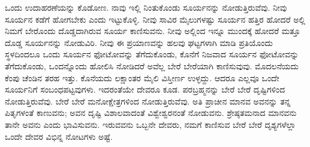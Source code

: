 ಒಂದು ಉದಾಹರಣೆಯನ್ನು ಕೊಡೋಣ. ನಾವು ಇಲ್ಲಿ ನಿಂತುಕೊಂಡು ಸೂರ್ಯನನ್ನು ನೋಡುತ್ತಿರುವೆವು. ನೀವು ಸೂರ್ಯನ ಕಡೆಗೆ ಹೋಗಬೇಕು ಎಂದು ಇಟ್ಟುಕೊಳ್ಳಿ. ನೀವು ಸಾವಿರ ಮೈಲುಗಳಷ್ಟು ಸೂರ್ಯನ ಹತ್ತಿರ ಹೋದರೆ ಅಲ್ಲಿ ನಿಮಗೆ ಬೇರೊಂದು ದೊಡ್ಡದಾಗಿರುವ ಸೂರ್ಯ ಕಾಣಿಸುವನು. ನೀವು ಅಲ್ಲಿಂದ ಇನ್ನೂ ಮುಂದಕ್ಕೆ ಹೋದರೆ ಮತ್ತೂ ದೊಡ್ಡ ಸೂರ್ಯನನ್ನು ನೋಡುವಿರಿ. ನೀವು ಈ ಪ್ರಯಾಣವನ್ನು ಹಲವು ಘಟ್ಟಗಳಾಗಿ ಮಾಡಿ ಪ್ರತಿಯೊಂದು ಸ್ಥಳದಿಂದಲೂ ಒಂದು ಸೂರ್ಯನ ಫೋಟೋವನ್ನು ತೆಗೆದುಕೊಂಡು, ಕೊನೆಗೆ ನಿಜವಾದ ಸೂರ್ಯನ ಫೋಟೋವನ್ನು ತೆಗೆದುಕೊಂಡು, ಒಂದನ್ನೊಂದು ಹೋಲಿಸಿ ನೋಡಿದರೆ ಅವೆಲ್ಲ ಬೇರೆ ಬೇರೆಯಾಗಿ ಕಾಣಿಸುವುವು. ಮೊದಲನೆಯದು ಕೆಂಪು ಚೆಂಡಿನ ತರಹ ಇತ್ತು. ಕೊನೆಯದು ಲಕ್ಷಾಂತರ ಮೈಲಿ ವಿಸ್ತೀರ್ಣ ಉಳ್ಳದ್ದು. ಆದರೂ ಎಲ್ಲವೂ ಒಂದೇ ಸೂರ್ಯನಿಗೆ ಸಂಬಂಧಪಟ್ಟವುಗಳು. ಇದರಂತೆಯೇ ದೇವರೂ ಕೂಡ. ಪರಬ್ರಹ್ಮನನ್ನು ಬೇರೆ ಬೇರೆ ದೃಷ್ಟಿಗಳಿಂದ ನೋಡುತ್ತಿರುವೆವು. ಬೇರೆ ಬೇರೆ ಮನೋಕ್ಷೇತ್ರಗಳಿಂದ ನೋಡುತ್ತಿರುವೆವು. ಅತಿ ಪ್ರಾಚೀನ ಮಾನವ ಅವನನ್ನು ತನ್ನ ಪಿತೃಗಳಂತೆ ಕಾಣುವನು; ಅವನ ದೃಷ್ಟಿ ವಿಶಾಲವಾದಂತೆ ವಿಶ್ವೇಶ್ವರನಂತೆ ನೋಡುವನು. ಶ್ರೇಷ್ಠತಮನಾದ ಮಾನವನು ತಾನೇ ಅವನು ಎಂದು ಭಾವಿಸುವನು. ಇರುವವನು ಒಬ್ಬನೇ ದೇವರು, ನಮಗೆ ಕಾಣಿಸುವ ಬೇರೆ ಬೇರೆ ದೃಶ್ಯಗಳೆಲ್ಲಾ ಒಂದೇ ದೇವರ ವಿಭಿನ್ನ ನೋಟಗಳು ಅಷ್ಟೆ.

